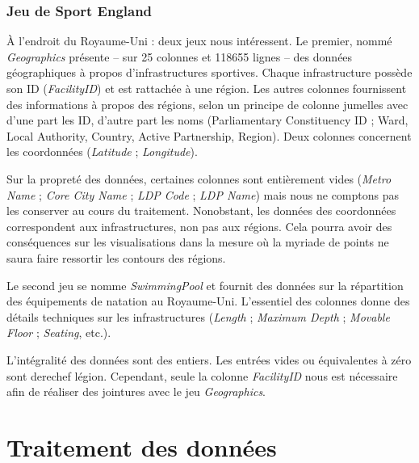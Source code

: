 \documentclass[hidelinks, 12pt]{article}
\begin{document}
\subsubsection{Jeu de Sport England}

À l'endroit du Royaume-Uni : deux jeux nous intéressent. Le premier, nommé \emph{Geographics} présente -- sur 25 colonnes et 118655 lignes -- des données géographiques à propos d'infrastructures sportives. Chaque infrastructure possède son ID (\emph{FacilityID}) et est rattachée à une région. Les autres colonnes fournissent des informations à propos des régions, selon un principe de colonne jumelles avec d'une part les ID, d'autre part les noms (Parliamentary Constituency ID ; Ward, Local Authority, Country, Active Partnership, Region). Deux colonnes concernent les coordonnées (\emph{Latitude} ; \emph{Longitude}).

Sur la propreté des données, certaines colonnes sont entièrement vides (\emph{Metro Name} ; \emph{Core City Name} ; \emph{LDP Code} ; \emph{LDP Name}) mais nous ne comptons pas les conserver au cours du traitement. Nonobstant, les données des coordonnées correspondent aux infrastructures, non pas aux régions. Cela pourra avoir des conséquences sur les visualisations dans la mesure où la myriade de points ne saura faire ressortir les contours des régions. 

Le second jeu se nomme \emph{SwimmingPool} et fournit des données sur la répartition des équipements de natation au Royaume-Uni. L'essentiel des colonnes donne des détails techniques sur les infrastructures (\emph{Length} ; \emph{Maximum Depth} ; \emph{Movable Floor} ; \emph{Seating}, etc.).

L'intégralité des données sont des entiers. Les entrées vides ou équivalentes à zéro sont derechef légion. Cependant, seule la colonne \emph{FacilityID} nous est nécessaire afin de réaliser des jointures avec le jeu \emph{Geographics}. 




















\section{Traitement des données}
\end{document}
